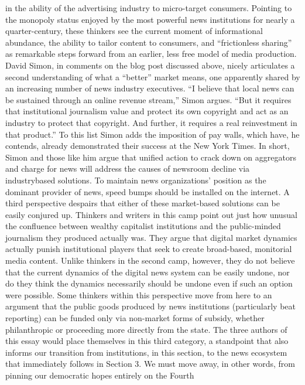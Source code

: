 in the ability of the advertising industry to micro-target consumers. Pointing to
the monopoly status enjoyed by the most powerful news institutions for nearly a
quarter-century, these thinkers see the current moment of informational abundance,
the ability to tailor content to consumers, and ``frictionless sharing'' as
remarkable steps forward from an earlier, less free model of media production.
David Simon, in comments on the blog post discussed above, nicely articulates a
second understanding of what a ``better'' market means, one apparently shared by
an increasing number of news industry executives. ``I believe that local news can
be sustained through an online revenue stream,'' Simon argues. ``But it requires
that institutional journalism value and protect its own copyright and act as an
industry to protect that copyright. And further, it requires a real reinvestment in
that product.'' To this list Simon adds the imposition of pay walls, which have, he
contends, already demonstrated their success at the New York Times. In short,
Simon and those like him argue that unified action to crack down on aggregators
and charge for news will address the causes of newsroom decline via industrybased
solutions. To maintain news organizations’ position as the dominant provider
of news, speed bumps should be installed on the internet.
A third perspective despairs that either of these market-based solutions can be
easily conjured up. Thinkers and writers in this camp point out just how unusual
the confluence between wealthy capitalist institutions and the public-minded
journalism they produced actually was. They argue that digital market dynamics
actually punish institutional players that seek to create broad-based, monitorial
media content. Unlike thinkers in the second camp, however, they do not believe
that the current dynamics of the digital news system can be easily undone, nor
do they think the dynamics necessarily should be undone even if such an option
were possible. Some thinkers within this perspective move from here to an argument
that the public goods produced by news institutions (particularly beat
reporting) can be funded only via non-market forms of subsidy, whether philanthropic
or proceeding more directly from the state.
The three authors of this essay would place themselves in this third category,
a standpoint that also informs our transition from institutions, in this section,
to the news ecosystem that immediately follows in Section 3. We must move
away, in other words, from pinning our democratic hopes entirely on the Fourth

